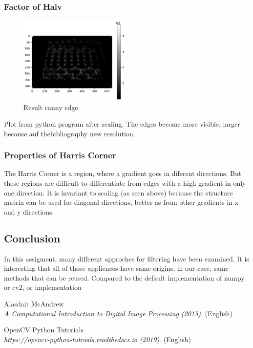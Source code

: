\documentclass[12pt]{article}
\begin{document}
\subsubsection{Factor of Halv}
\begin{figure}[!htb]
  \centering
  \includegraphics[width=0.5\textwidth]{pics/3_4_s}
  \caption{Result canny edge}
\end{figure}
Plot from python program after scaling. The edges become more visible, larger because auf thebibliography
new resolution.

\subsubsection{Properties of Harris Corner}
The Harris Corner is a region, where a gradient goes in diferent directions. But these regions are difficult to
differentiate from edges with a high gradient in only one direction. It is invariant to scaling (as seen above)
because the structure matrix can be used for diagonal directions, better as from other gradients in x and y directions.

\newpage
\subsection{Conclusion}
In this assigment, many different approches for filtering have been examined. It is interesting that all of those appliences 
have same origins, in our case, same methods that can be reused. Compared to the default implementation of numpy or cv2, or 
implementation 


\pagebreak
\begin{thebibliography}{1}
  Alasdair McAndrew
  \\\textit{A Computational Introduction to Digital Image Processing (2015)}. (English)  

  OpenCV Python Tutorials
  \\\textit{https://opencv-python-tutroals.readthedocs.io (2019)}. (English)  
\end{thebibliography}
\end{document}
